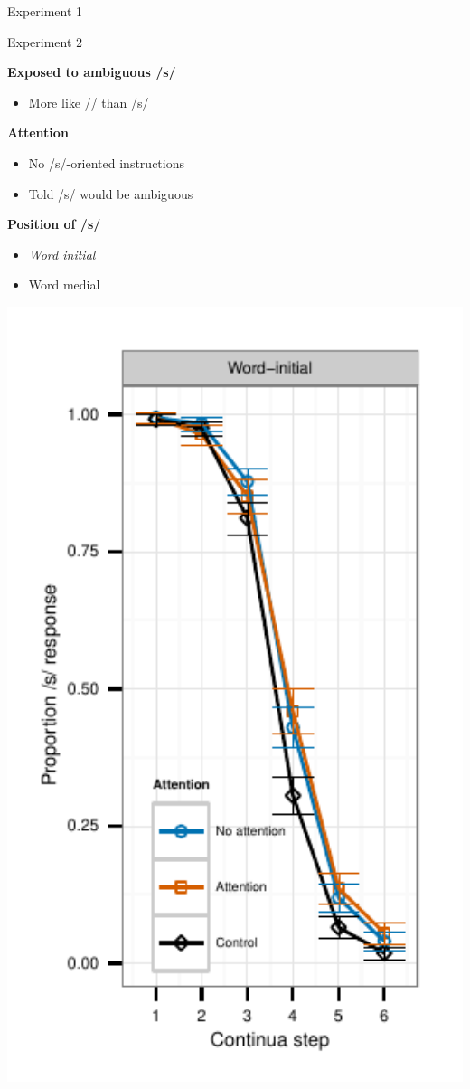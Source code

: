\documentclass{beamer}
\begin{document}
\begin{frame}{Experiment 1}
\end{frame}

\begin{frame}{Experiment 2}

\begin{minipage}{0.45\textwidth}
\textbf{Exposed to ambiguous /s/}
\begin{itemize}
\item More like /\textesh/ than /s/
\end{itemize}

\textbf{Attention}
\begin{itemize}
\item No /s/-oriented instructions
\item Told /s/ would be ambiguous
\end{itemize}

\textbf{Position of /s/}
\begin{itemize}
\item \emph{Word initial}
\item Word medial
\end{itemize}
\end{minipage}
\hfill
\begin{minipage}{0.4\textwidth}
\includegraphics[width=1.0\textwidth]{graphs/exp2_categresults_present2-initial}

\end{minipage}
\end{frame}
\end{document}
